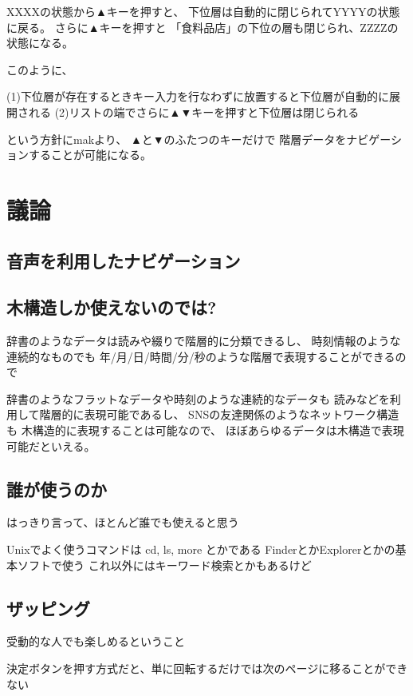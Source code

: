 \documentclass[twoside]{wiss}
\def\▲{▲}
\def\▼{▼}
\begin{document}
XXXXの状態から{\▲}キーを押すと、
下位層は自動的に閉じられてYYYYの状態に戻る。 
さらに{\▲}キーを押すと
「食料品店」の下位の層も閉じられ、ZZZZの状態になる。

このように、

(1)下位層が存在するときキー入力を行なわずに放置すると下位層が自動的に展開される
(2)リストの端でさらに{\▲}{\▼}キーを押すと下位層は閉じられる

という方針にmakより、
{\▲}と{\▼}のふたつのキーだけで
階層データをナビゲーションすることが可能になる。


\section{議論}

\subsection*{音声を利用したナビゲーション}

\subsection*{木構造しか使えないのでは?}

辞書のようなデータは読みや綴りで階層的に分類できるし、
時刻情報のような連続的なものでも
年/月/日/時間/分/秒のような階層で表現することができるので

辞書のようなフラットなデータや時刻のような連続的なデータも
読みなどを利用して階層的に表現可能であるし、
SNSの友達関係のようなネットワーク構造も
木構造的に表現することは可能なので、
ほぼあらゆるデータは木構造で表現可能だといえる。

\subsection*{誰が使うのか}

  はっきり言って、ほとんど誰でも使えると思う

  Unixでよく使うコマンドは cd, ls, more とかである
  FinderとかExplorerとかの基本ソフトで使う
  これ以外にはキーワード検索とかもあるけど

\subsection*{ザッピング}
   受動的な人でも楽しめるということ

  決定ボタンを押す方式だと、単に回転するだけでは次のページに移ることができない
\end{document}
